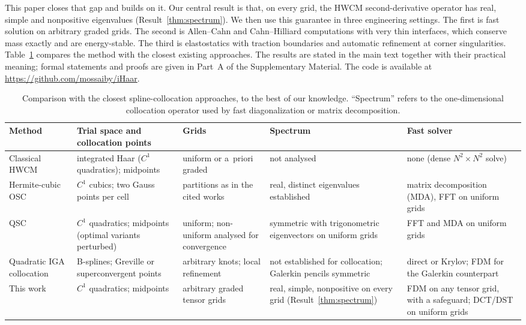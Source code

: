 \documentclass[preprint,12pt]{elsarticle}
\theoremstyle{remark}
\newcommand{\repo}{\url{https://github.com/mossaiby/iHaar}}
\begin{document}
This paper closes that gap and builds on it. Our central result is that, on every grid, the HWCM
second-derivative operator has real, simple and nonpositive eigenvalues (Result~\ref{thm:spectrum}). We
then use this guarantee in three engineering settings. The first is fast solution on arbitrary graded
grids. The second is Allen--Cahn and Cahn--Hilliard computations with very thin interfaces, which
conserve mass exactly and are energy-stable. The third is elastostatics with traction boundaries and
automatic refinement at corner singularities. Table~\ref{tab:closest} compares the method with the
closest existing approaches. The results are stated in the main text together with their practical
meaning; formal statements and proofs are given in Part~A of the Supplementary Material. The code is
available at \repo.

\begin{table}[t]\centering\footnotesize
\caption{Comparison with the closest spline-collocation approaches, to the best of our knowledge. ``Spectrum'' refers to the one-dimensional collocation operator used by fast diagonalization or matrix decomposition.}\label{tab:closest}
\begin{tabular}{p{2.2cm}p{2.6cm}p{2.0cm}p{3.4cm}p{2.6cm}}
\toprule
Method & Trial space and collocation points & Grids & Spectrum & Fast solver\\
\midrule
Classical HWCM~\cite{lepik2011solving,oruc2019nonuniform} & integrated Haar ($C^1$ quadratics); midpoints & uniform or a~priori graded & not analysed & none (dense $N^2\times N^2$ solve)\\
Hermite-cubic OSC~\cite{dyksen1987tensor,sun1999spectral,bialecki1995matrix} & $C^1$ cubics; two Gauss points per cell & partitions as in the cited works & real, distinct eigenvalues established & matrix decomposition (MDA), FFT on uniform grids\\
QSC~\cite{houstis1988quadratic,christara2002fast,christara2006optimal} & $C^1$ quadratics; midpoints (optimal variants perturbed) & uniform; non-uniform analysed for convergence & symmetric with trigonometric eigenvectors on uniform grids & FFT and MDA on uniform grids\\
Quadratic IGA collocation~\cite{auricchio2010isogeometric,schillinger2013isogeometric,delorenzis2015isogeometric} & B-splines; Greville or superconvergent points & arbitrary knots; local refinement & not established for collocation; Galerkin pencils symmetric~\cite{sangalli2016isogeometric} & direct or Krylov; FDM for the Galerkin counterpart\\
This work & $C^1$ quadratics; midpoints & arbitrary graded tensor grids & real, simple, nonpositive on every grid (Result~\ref{thm:spectrum}) & FDM on any tensor grid, with a safeguard; DCT/DST on uniform grids\\
\bottomrule
\end{tabular}
\end{table}
\end{document}
